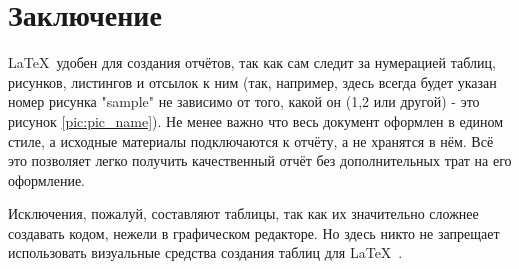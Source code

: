 \newpage
\section*{Заключение}
\LaTeX\ удобен для создания отчётов, так как сам следит за нумерацией таблиц,
рисунков, листингов и отсылок к ним (так, например, здесь всегда будет указан
номер рисунка "sample" не зависимо от того, какой он (1,2 или другой) - это
рисунок \ref{pic:pic_name}). Не менее важно что весь документ оформлен в едином
стиле, а исходные материалы подключаются к отчёту, а не хранятся в нём. Всё это
позволяет легко получить качественный отчёт без дополнительных трат на его
оформление.

Исключения, пожалуй, составляют таблицы, так как их значительно сложнее
создавать кодом, нежели в графическом редакторе. Но здесь никто не запрещает
использовать визуальные средства создания таблиц для \LaTeX\ .
